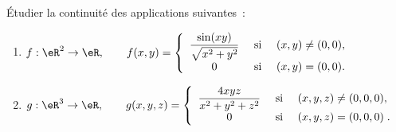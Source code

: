 \begin{exercice}[\minsyndical]\label{exoLimiteContinue0011}

Étudier la continuité des applications suivantes~:
\begin{enumerate}
	\item
  $f : \eR^2 \to \eR , \qquad f(x,y) = 
           \left\{
             \begin{array}{ccl}
                \displaystyle \frac{ \sin(xy)}{\sqrt{x^2+y^2}} & \mbox{ si }
                                             & (x,y)\neq (0,0), \\
                0 & \mbox{ si } & (x,y)=(0,0) .
             \end{array}
           \right. $
	\item
 $ g : \eR^3 \to \eR, \qquad g(x,y,z) = 
           \left\{
             \begin{array}{ccl}
                \displaystyle \frac{4xyz}{x^2+y^2+z^2} & \mbox{ si }
                                         & (x,y,z)\neq (0,0,0), \\
                 0 & \mbox{ si } & (x,y,z)=(0,0,0)\; .
             \end{array}
           \right.$
\end{enumerate}

\end{exercice}
